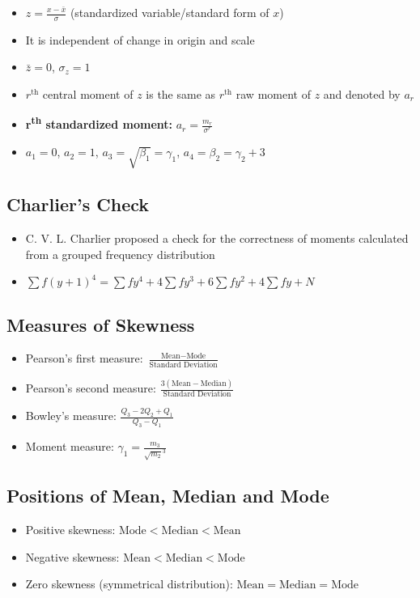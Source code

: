 \begin{itemize}
    \item $z = \frac{x - \bar{x}}{\sigma}$ (standardized variable/standard form of $x$)
    \item It is independent of change in origin and scale
    \item $\bar{z} = 0$, $\sigma_z = 1$
    \item $r^\text{th}$ central moment of $z$ is the same as $r^\text{th}$ raw moment of $z$ and denoted by $a_r$
    \item \textbf{r\textsuperscript{th} standardized moment: } $a_r = \frac{m_r}{\sigma^r}$
    \item $a_1 = 0$, $a_2 = 1$, $a_3 = \sqrt{\beta_1} = \gamma_1$, $a_4 = \beta_2 = \gamma_2 + 3$
\end{itemize}

\subsection*{Charlier's Check}

\begin{itemize}
    \item C. V. L. Charlier proposed a check for the correctness of moments calculated from a grouped frequency distribution
    \item $\sum f(y + 1)^4 = \sum fy^4 + 4 \sum fy^3 + 6 \sum fy^2 + 4 \sum fy + N$
\end{itemize}

\subsection*{Measures of Skewness}
\begin{itemize}
    \item Pearson's first measure: $\frac{\text{Mean} - \text{Mode}}{\text{Standard Deviation}}$
    \item Pearson's second measure: $\frac{3(\text{Mean} - \text{Median})}{\text{Standard Deviation}}$
    \item Bowley's measure: $\frac{Q_3 - 2Q_2 + Q_1}{Q_3 - Q_1}$
    \item Moment measure: $\gamma_1 = \frac{m_3}{\sqrt{m_2}^3}$
\end{itemize}

\subsection*{Positions of Mean, Median and Mode}
\begin{itemize}
    \item Positive skewness: $\text{Mode} < \text{Median} < \text{Mean}$
    \item Negative skewness: $\text{Mean} < \text{Median} < \text{Mode}$
    \item Zero skewness (symmetrical distribution): $\text{Mean} = \text{Median} = \text{Mode}$
\end{itemize}

